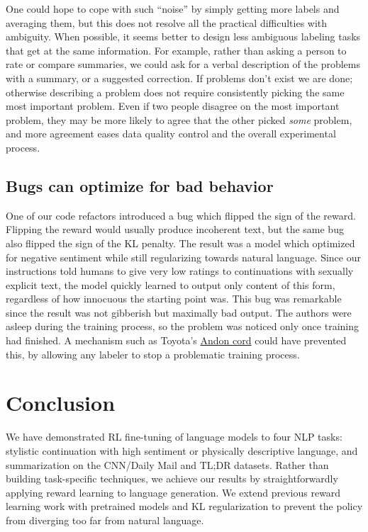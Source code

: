 One could hope to cope with such ``noise'' by simply getting more labels and averaging them, but this does not resolve all the practical difficulties with ambiguity. When possible, it seems better to design less ambiguous labeling tasks that get at the same information. For example, rather than asking a person to rate or compare summaries, we could ask for a verbal description of the problems with a summary, or a suggested correction.  If problems don't exist we are done; otherwise describing a problem does not require consistently picking the same most important problem.  Even if two people disagree on the most important problem, they may be more likely to agree that the other picked \emph{some} problem, and more agreement eases data quality control and the overall experimental process.

\subsection{Bugs can optimize for bad behavior}

One of our code refactors introduced a bug which flipped the sign of the reward.  Flipping the reward would usually produce incoherent text, but the same bug also flipped the sign of the KL penalty. The result was a model which optimized for negative sentiment while still regularizing towards natural language. Since our instructions told humans to give very low ratings to continuations with sexually explicit text, the model quickly learned to output only content of this form, regardless of how innocuous the starting point was.  This bug was remarkable since the result was not gibberish but maximally bad output. The authors were asleep during the training process, so the problem was noticed only once training had finished. A mechanism such as Toyota's \href{https://en.wikipedia.org/wiki/Andon_(manufacturing)}{Andon cord} could have prevented this, by allowing any labeler to stop a problematic training process.

\section{Conclusion}

We have demonstrated RL fine-tuning of language models to four NLP tasks: stylistic continuation with high sentiment or physically descriptive language, and summarization on the CNN/Daily Mail and TL;DR datasets.  Rather than building task-specific techniques, we achieve our results by straightforwardly applying reward learning to language generation.  We extend previous reward learning work with pretrained models and KL regularization to prevent the policy from diverging too far from natural language.

